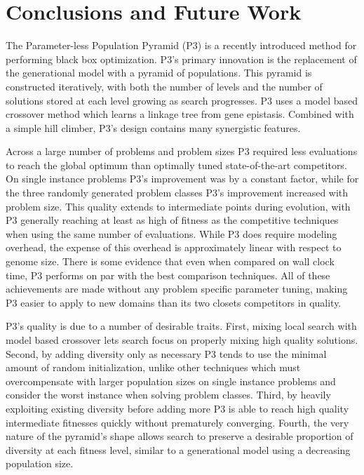\chapter{Conclusions and Future Work}
The Parameter-less Population Pyramid (P3) is a recently introduced method for performing black box
optimization. P3's primary innovation is the replacement of the generational model with a pyramid of populations.
This pyramid is constructed iteratively, with both the number of levels and the number of solutions stored
at each level growing as search progresses. P3 uses a model based crossover method
which learns a linkage tree from gene epistasis. Combined with a simple hill climber, P3's design contains
many synergistic features.

Across a large number of problems and problem sizes P3 required less evaluations to reach the global optimum
than optimally tuned state-of-the-art competitors. On single instance problems P3's improvement was by a
constant factor, while for the three randomly generated problem classes P3's improvement increased with problem size. This
quality extends to intermediate points during evolution, with P3 generally reaching at least as high
of fitness as the competitive techniques when using the same number of evaluations. While P3 does require
modeling overhead, the expense of this overhead is approximately linear with respect to genome size. There
is some evidence that even when compared on wall clock time, P3 performs on par with
the best comparison techniques. All of these achievements are made without any problem specific parameter
tuning, making P3 easier to apply to new domains than its two closets competitors in quality.

P3's quality is due to a number of desirable traits. First, mixing local search with model based
crossover lets search focus on properly mixing high quality solutions. Second, by adding diversity only
as necessary P3 tends to use the minimal amount of random initialization, unlike other techniques which must
overcompensate with larger population sizes on single instance problems and consider the worst instance
when solving problem classes. Third, by heavily exploiting existing diversity before adding more P3 is able
to reach high quality intermediate fitnesses quickly without prematurely converging. Fourth, the very
nature of the pyramid's shape allows search to preserve a desirable proportion of diversity at
each fitness level, similar to a generational model using a decreasing population size.

